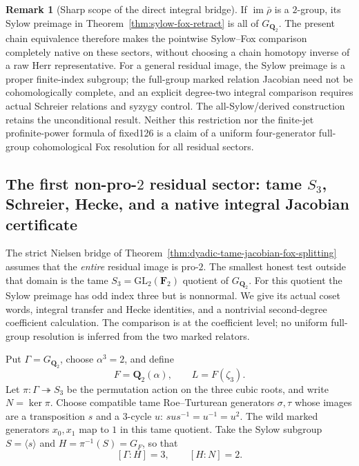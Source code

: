 \documentclass[11pt]{article}
\theoremstyle{definition}
\newtheorem{remark}[theorem]{Remark}
\begin{document}
\begin{remark}[Sharp scope of the direct integral bridge]
\label{rem:dyadic-full-chain-bridge-scope}
If $\operatorname{im}\bar\rho$ is a
$2$-group, its Sylow preimage
in Theorem~\ref{thm:sylow-fox-retract}
is all of $G_{\mathbf Q_2}$.
The present chain equivalence therefore
makes the pointwise Sylow--Fox
comparison completely native on
these sectors, without choosing
a chain homotopy inverse of a raw
Herr representative.
For a general residual image,
the Sylow preimage is a proper
finite-index subgroup; the
full-group marked relation
Jacobian need not be cohomologically
complete, and an explicit
degree-two integral comparison
requires actual Schreier
relations and syzygy control.
The all-Sylow/derived construction
retains the unconditional result.
Neither this restriction nor the
finite-jet profinite-power formula
of fixed126 is a claim of a uniform
four-generator full-group
cohomological Fox resolution
for all residual sectors.
\end{remark}


\subsection{The first non-pro-$2$ residual sector: tame $S_3$, Schreier,
Hecke, and a native integral Jacobian certificate}
\label{subsec:dyadic-s3-schreier-hecke}

The strict Nielsen bridge of
Theorem~\ref{thm:dyadic-tame-jacobian-fox-splitting}
assumes that the \emph{entire} residual image is pro-$2$.
The smallest honest test outside that domain is the tame
$S_3=\mathrm{GL}_2(\mathbf F_2)$ quotient of $G_{\mathbf Q_2}$.
For this quotient the Sylow preimage has odd index three
but is nonnormal.  We give its actual coset words,
integral transfer and Hecke identities, and a nontrivial
second-degree coefficient calculation.  The comparison is
at the coefficient level; no uniform full-group
resolution is inferred from the two marked relators.

Put $\Gamma=G_{\mathbf Q_2}$, choose
$\alpha^3=2$, and define
\[
F=\mathbf Q_2(\alpha),\qquad
L=F(\zeta_3).
\]
Let $\pi:\Gamma\twoheadrightarrow S_3$ be the
permutation action on the three cubic roots,
and write $N=\ker\pi$.  Choose compatible tame
Roe--Turturean generators $\sigma,\tau$ whose
images are a transposition $s$ and a $3$-cycle $u$:
$sus^{-1}=u^{-1}=u^2$.
The wild marked generators $x_0,x_1$
map to $1$ in this tame quotient.
Take the Sylow subgroup $S=\langle s\rangle$
and $H=\pi^{-1}(S)=G_F$, so that
\[
[\Gamma:H]=3,\qquad [H:N]=2.
\]
\end{document}
